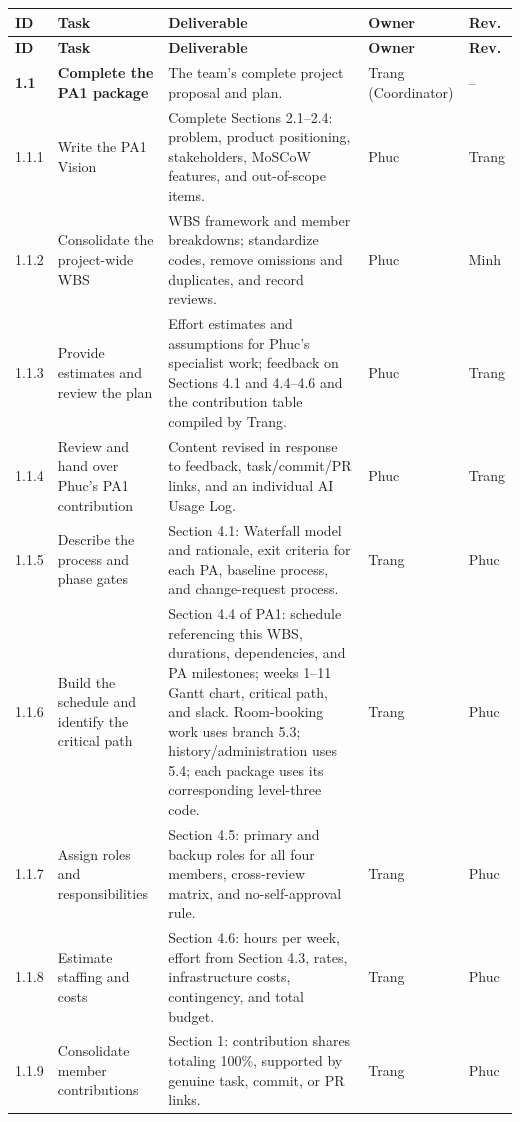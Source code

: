 \documentclass[11pt]{article}
\begin{document}
\begin{longtable}{@{}L{1.15cm}L{3.2cm}L{7.6cm}L{1.4cm}L{1.4cm}@{}}
\toprule
\textbf{ID} & \textbf{Task} & \textbf{Deliverable} & \textbf{Owner} & \textbf{Rev.} \\
\midrule\endfirsthead\toprule
\textbf{ID} & \textbf{Task} & \textbf{Deliverable} & \textbf{Owner} & \textbf{Rev.} \\
\midrule\endhead
\textbf{1.1} & \textbf{Complete the PA1 package} & The team's complete project proposal and plan. & Trang (Coordinator) & -- \\
1.1.1 & Write the PA1 Vision & Complete Sections 2.1--2.4: problem, product positioning, stakeholders, MoSCoW features, and out-of-scope items. & Phuc & Trang \\
1.1.2 & Consolidate the project-wide WBS & WBS framework and member breakdowns; standardize codes, remove omissions and duplicates, and record reviews. & Phuc & Minh \\
1.1.3 & Provide estimates and review the plan & Effort estimates and assumptions for Phuc's specialist work; feedback on Sections 4.1 and 4.4--4.6 and the contribution table compiled by Trang. & Phuc & Trang \\
1.1.4 & Review and hand over Phuc's PA1 contribution & Content revised in response to feedback, task/commit/PR links, and an individual AI Usage Log. & Phuc & Trang \\
1.1.5 & Describe the process and phase gates & Section 4.1: Waterfall model and rationale, exit criteria for each PA, baseline process, and change-request process. & Trang & Phuc \\
1.1.6 & Build the schedule and identify the critical path & Section 4.4 of PA1: schedule referencing this WBS, durations, dependencies, and PA milestones; weeks 1--11 Gantt chart, critical path, and slack. Room-booking work uses branch 5.3; history/administration uses 5.4; each package uses its corresponding level-three code. & Trang & Phuc \\
1.1.7 & Assign roles and responsibilities & Section 4.5: primary and backup roles for all four members, cross-review matrix, and no-self-approval rule. & Trang & Phuc \\
1.1.8 & Estimate staffing and costs & Section 4.6: hours per week, effort from Section 4.3, rates, infrastructure costs, contingency, and total budget. & Trang & Phuc \\
1.1.9 & Consolidate member contributions & Section 1: contribution shares totaling 100\%, supported by genuine task, commit, or PR links. & Trang & Phuc \\

\end{longtable}
\end{document}
